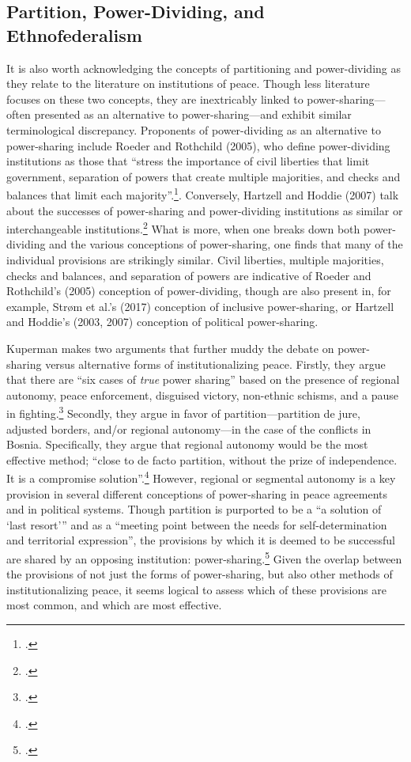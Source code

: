 \documentclass[12pt]{article}
\begin{document}
\subsection{Partition, Power-Dividing, and Ethnofederalism}
It is also worth acknowledging the concepts of partitioning and power-dividing as they relate to the literature on institutions of peace. Though less literature focuses on these two concepts, they are inextricably linked to power-sharing---often presented as an alternative to power-sharing---and exhibit similar terminological discrepancy. Proponents of power-dividing as an alternative to power-sharing include Roeder and Rothchild (2005), who define power-dividing institutions as those that ``stress the importance of civil liberties that limit government, separation of powers that create multiple majorities, and checks and balances that limit each majority''.\footcite[52]{roeder_sustainable_2003}. Conversely, Hartzell and Hoddie (2007) talk about the successes of power-sharing and power-dividing institutions as similar or interchangeable institutions.\footcite[150-152]{hartzell_crafting_2007} What is more, when one breaks down both power-dividing and the various conceptions of power-sharing, one finds that many of the individual provisions are strikingly similar. Civil liberties, multiple majorities, checks and balances, and separation of powers are indicative of Roeder and Rothchild’s (2005) conception of power-dividing, though are also present in, for example, Strøm et al.’s (2017) conception of inclusive power-sharing, or Hartzell and Hoddie’s (2003, 2007) conception of political power-sharing. 

Kuperman makes two arguments that further muddy the debate on power-sharing versus alternative forms of institutionalizing peace. Firstly, they argue that there are ``six cases of \textit{true} power sharing'' based on the presence of regional autonomy, peace enforcement, disguised victory, non-ethnic schisms, and a pause in fighting.\footcite[emphasis added]{kuperman_power_2006} Secondly, they argue in favor of partition—partition de jure, adjusted borders, and/or regional autonomy—in the case of the conflicts in Bosnia. Specifically, they argue that regional autonomy would be the most effective method; ``close to de facto partition, without the prize of independence. It is a compromise solution''.\footcite{kuperman_power-sharing_2006} However, regional or segmental autonomy is a key provision in several different conceptions of power-sharing in peace agreements and in political systems. Though partition is purported to be a ``a solution of ‘last resort’'' and as a ``meeting point between the needs for self-determination and territorial expression'', the provisions by which it is deemed to be successful are shared by an opposing institution: power-sharing.\footcite[32]{berg_introduction:_2008, waterman_partitioned_1987} Given the overlap between the provisions of not just the forms of power-sharing, but also other methods of institutionalizing peace, it seems logical to assess which of these provisions are most common, and which are most effective.
\end{document}
